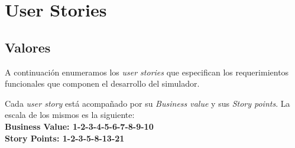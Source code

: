 \section{User Stories}

\subsection{Valores}

A continuación enumeramos los \textit{user stories} que especifican los requerimientos funcionales que componen el desarrollo del simulador.

Cada \textit{user story} está acompañado por su \textit{Business value} y sus \textit{Story points}. La escala de los mismos es la siguiente:\\

\textbf{Business Value: 1-2-3-4-5-6-7-8-9-10}\\

\textbf{Story Points: 1-2-3-5-8-13-21}

